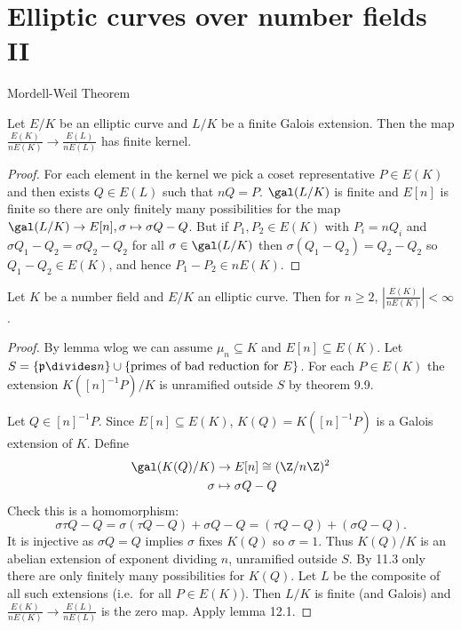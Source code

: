 \documentclass[a4paper]{article}
\theoremstyle{definition}
\theoremstyle{theorem}
\begin{document}
\section{Elliptic curves over number fields II}

Mordell-Weil Theorem

\begin{lemma}
  Let \(E/K\) be an elliptic curve and \(L/K\) be a finite Galois extension. Then the map \(\frac{E(K)}{n E(K)} \to \frac{E(L)}{n E(L)}\) has finite kernel.
\end{lemma}

\begin{proof}
  For each element in the kernel we pick a coset representative \(P \in E(K)\) and then exists \(Q \in E(L)\) such that \(n Q = P\). \(\gal(L/K)\) is finite and \(E[n]\) is finite so there are only finitely many possibilities for the map \(\gal(L/K) \to E[n], \sigma \mapsto \sigma Q - Q\). But if \(P_1, P_2 \in E(K)\) with \(P_i = nQ_i\) and \(\sigma Q_1 - Q_2 = \sigma Q_2 - Q_2\) for all \(\sigma \in \gal(L/K)\) then \(\sigma(Q_1 - Q_2) = Q_2 - Q_2\) so \(Q_1 - Q_2 \in E(K)\), and hence \(P_1 - P_2 \in n E(K)\).
\end{proof}

\begin{theorem}
  Let \(K\) be a number field and \(E/K\) an elliptic curve. Then for \(n \geq 2\), \(|\frac{E(K)}{n E(K)}| < \infty\).
\end{theorem}

\begin{proof}
  By lemma wlog we can assume \(\mu_n \subseteq K\) and \(E[n] \subseteq E(K)\). Let \(S = \{\mathfrak p \divides n\} \cup \{\text{primes of bad reduction for } E\}\). For each \(P \in E(K)\) the extension \(K([n]^{-1}P)/K\) is unramified outside \(S\) by theorem 9.9.

  Let \(Q \in [n]^{-1}P\). Since \(E[n] \subseteq E(K)\), \(K(Q) = K([n]^{-1}P)\) is a Galois extension of \(K\). Define
  \begin{align*}
    \gal(K(Q)/K) &\to E[n] \cong (\Z/n\Z)^2 \\
    \sigma &\mapsto \sigma Q - Q
  \end{align*}
  Check this is a homomorphism:
  \[
    \sigma\tau Q - Q = \sigma(\tau Q - Q) + \sigma Q - Q = (\tau Q - Q) + (\sigma Q - Q).
  \]
  It is injective as \(\sigma Q = Q\) implies \(\sigma\) fixes \(K(Q)\) so \(\sigma = 1\). Thus \(K(Q)/K\) is an abelian extension of exponent dividing \(n\), unramified outside \(S\). By 11.3 only there are only finitely many possibilities for \(K(Q)\). Let \(L\) be the composite of all such extensions (i.e.\ for all \(P \in E(K)\)). Then \(L/K\) is finite (and Galois) and \(\frac{E(K)}{nE(K)} \to \frac{E(L)}{nE(L)}\) is the zero map. Apply lemma 12.1.
\end{proof}
\end{document}
